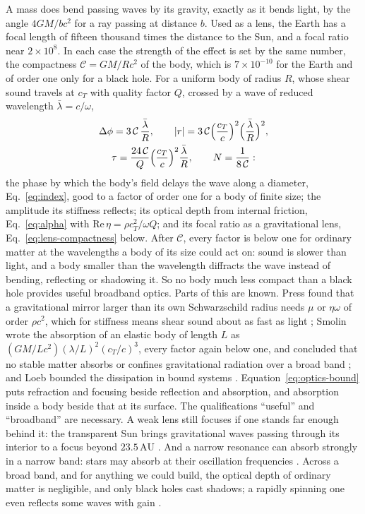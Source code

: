 A mass does bend passing waves by its gravity, exactly as it bends light, by
the angle $4GM/bc^{2}$ for a ray passing at distance $b$. Used as a lens, the
Earth has a focal length of fifteen thousand times the distance to the Sun,
and a focal ratio near $2\times10^{8}$. In each case the strength of the effect is
set by the same number, the compactness $\mathcal{C} = GM/Rc^{2}$ of the body,
which is $7\times10^{-10}$ for the Earth and of order one only for a black hole.
For a uniform body of radius $R$, whose shear sound travels at $c_T$ with
quality factor $Q$, crossed by a wave of reduced wavelength
$\bar\lambda = c/\omega$,
\begin{equation}\label{eq:optics-bound}
\begin{gathered}
\Delta\phi = 3\,\mathcal{C}\,\frac{\bar\lambda}{R} , \qquad
|r| = 3\,\mathcal{C}\Bigl(\frac{c_T}{c}\Bigr)^{2}
\Bigl(\frac{\bar\lambda}{R}\Bigr)^{2} , \\
\tau = \frac{24\,\mathcal{C}}{Q}\Bigl(\frac{c_T}{c}\Bigr)^{2}
\frac{\bar\lambda}{R} , \qquad
N = \frac{1}{8\,\mathcal{C}} :
\end{gathered}
\end{equation}
the phase by which the body's field delays the wave along a diameter,
Eq.~\eqref{eq:index}, good to a factor of order one for a body of finite size; the
amplitude its stiffness reflects; its optical depth from internal friction,
Eq.~\eqref{eq:alpha} with $\mathrm{Re}\,\eta = \rho c_T^2/\omega Q$; and its
focal ratio as a gravitational lens, Eq.~\eqref{eq:lens-compactness} below.
After $\mathcal{C}$, every factor is below one for ordinary matter at the
wavelengths a body of its size could act on: sound is slower than light, and a
body smaller than the wavelength diffracts the wave instead of bending,
reflecting or shadowing it. So no body much less compact than a black hole
provides useful broadband optics. Parts of this are known. Press found that a
gravitational mirror larger than its own Schwarzschild radius needs
$\mu$ or $\eta\omega$ of order $\rho c^2$, which for stiffness means shear
sound about as fast as light \cite{Press1979}; Smolin wrote the absorption of an
elastic body of length $L$ \cite{Dyson1969} as
$(GM/Lc^2)(\lambda/L)^2(c_T/c)^3$, every factor again below one, and concluded that no stable matter absorbs
or confines gravitational radiation over a broad band
\cite{Smolin1984,Smolin1985}; and Loeb bounded the dissipation in bound
systems \cite{Loeb2020}. Equation~\eqref{eq:optics-bound} puts refraction and
focusing beside reflection and absorption, and absorption inside a body beside
that at its surface. The qualifications ``useful'' and ``broadband'' are
necessary. A weak lens still focuses if one stands far enough behind it: the
transparent Sun brings gravitational waves passing through its interior to a
focus beyond $23.5\,\mathrm{AU}$ \cite{PatlaNemiroff2008}. And a narrow resonance can absorb
strongly in a narrow band: stars may absorb at their oscillation frequencies
\cite{McKernan2014}. Across a broad band, and for anything we could build,
the optical depth of ordinary matter is negligible, and only black holes cast
shadows; a rapidly spinning one even reflects some waves with gain
\cite{TeukolskyPress1974}.

